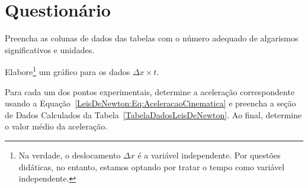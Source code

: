 
\vspace{15mm}

\begin{fullwidth}
\noindent{}
\vspace{5mm}

\noindent{}

\noindent{}

\noindent{}

\noindent{}

\noindent{}
\end{fullwidth}

\vspace{5mm}

\section{Questionário}

\begin{question}[type={exam}]
Preencha as colunas de dados das tabelas com o número adequado de algarismos significativos e unidades.
\end{question}

\begin{question}[type={exam}]
Elabore\footnote{Na verdade, o deslocamento $\Delta x$ é a variável independente. Por questões didáticas, no entanto, estamos optando por tratar o tempo como variável independente.} um gráfico para os dados $\Delta x \times t$.
\end{question}

\begin{question}[type={exam}]
Para cada um dos pontos experimentais, determine a aceleração correspondente usando a Equação~\eqref{LeisDeNewton:Eq:AceleracaoCinematica} e preencha a seção de Dados Calculados da Tabela~\ref{TabelaDadosLeisDeNewton}. Ao final, determine o valor médio da aceleração.
\end{question}

